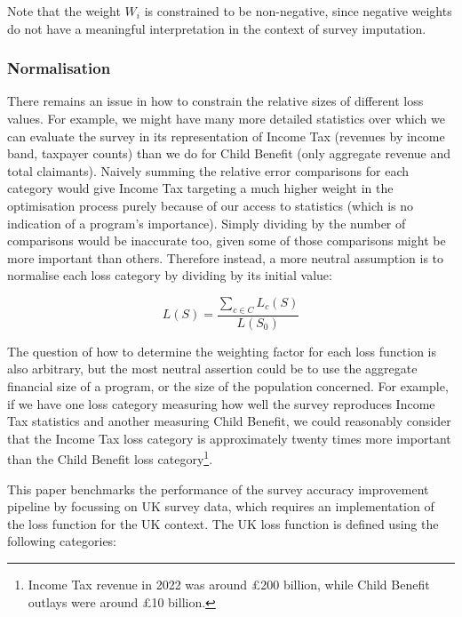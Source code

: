 \documentclass[10pt,journal,compsoc]{IEEEtran}
\begin{document}
Note that the weight $W_i$ is constrained to be non-negative, since negative weights do not have a meaningful interpretation in the context of survey imputation.

\subsubsection{Normalisation} There remains an issue in how to constrain the relative sizes of different loss values. For example, we might have many more detailed statistics over which we can evaluate the survey in its representation of Income Tax (revenues by income band, taxpayer counts) than we do for Child Benefit (only aggregate revenue and total claimants). Naively summing the relative error comparisons for each category would give Income Tax targeting a much higher weight in the optimisation process purely because of our access to statistics (which is no indication of a program's importance). Simply dividing by the number of comparisons would be inaccurate too, given some of those comparisons might be more important than others. Therefore instead, a more neutral assumption is to normalise each loss category by dividing by its initial value:

\begin{equation}
  L(S) = \frac{\sum_{c \in C} L_c(S)}{L(S_0)}
\end{equation}

The question of how to determine the weighting factor for each loss function is also arbitrary, but the most neutral assertion could be to use the aggregate financial size of a program, or the size of the population concerned. For example, if we have one loss category measuring how well the survey reproduces Income Tax statistics and another measuring Child Benefit, we could reasonably consider that the Income Tax loss category is approximately twenty times more important than the Child Benefit loss category\footnote{Income Tax revenue in 2022 was around £200 billion, while Child Benefit outlays were around £10 billion.}.

This paper benchmarks the performance of the survey accuracy improvement pipeline by focussing on UK survey data, which requires an implementation of the loss function for the UK context. The UK loss function is defined using the following categories:
\end{document}
